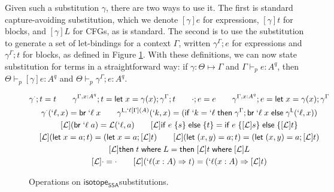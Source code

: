 \documentclass[acmsmall,screen,review]{acmart}
\newcommand{\mc}[1]{\ensuremath{\mathcal{#1}}}
\newcommand{\ms}[1]{\ensuremath{\mathsf{#1}}}
\newcommand{\lbl}[1]{{`#1}}
\newcommand{\lto}{\Rightarrow}
\newcommand{\letstmt}[3]{\ensuremath{\ms{let}\;#1 = #2; #3}}
\newcommand{\brb}[2]{\ms{br}\;#1\;#2}
\newcommand{\lbrb}[2]{\brb{\lbl{#1}}{#2}}
\newcommand{\ite}[3]{\ms{if}\;#1\;\{#2\}\;\ms{else}\;\{#3\}}
\newcommand{\ewhere}[2]{\ms{then}\;#1\;\ms{where}\;#2}
\newcommand{\wbranch}[3]{#1(#2) \lto #3}
\newcommand{\lwbranch}[3]{\wbranch{\lbl{#1}}{#2}{#3}}
\newcommand{\lhyp}[3]{#1[#2](#3)}
\newcommand{\llhyp}[3]{\lhyp{\lbl{#1}}{#2}{#3}}
\newcommand{\hasty}[5]{#1 \vdash_{#2} #3: {#4}^{#5}}
\newcommand{\issubst}[3]{#1: #2 \mapsto #3}
\newcommand{\exprletsubst}[2]{{#1};{#2}}
\newcommand{\stmtletsubst}[2]{{#1};{#2}}
\newcommand{\substctx}[2]{{#1}^{#2}}
\newcommand{\substlbs}[2]{{#1}^{#2}}
\newcommand{\restrictsubst}[2]{{#1}_{#2}}
\newcommand{\isotopessa}{\ms{isotope_{SSA}}}
\begin{document}
Given such a substitution \(\gamma\), there are two ways to use it. The first is
standard capture-avoiding substitution, which we denote \([\gamma]e\) for
expressions, \([\gamma]t\) for blocks, and \([\gamma]L\) for CFGs, as is
standard. The second is to use the substitution to generate a set of
let-bindings for a context \(\Gamma\), written
\(\exprletsubst{\substctx{\gamma}{\Gamma}}{e}\) for expressions and
\(\stmtletsubst{\substctx{\gamma}{\Gamma}}{t}\) for blocks, as defined in Figure
\ref{fig:ssa-subst-ops}. 
%
%
%
With these definitions, we can now state substitution for terms in a
straightforward way: if \(\issubst{\gamma}{\Theta}{\Gamma}\) and
\(\hasty{\Gamma}{p}{e}{A}{q}\), then \(\hasty{\Theta}{p}{[\gamma]e}{A}{q}\) and
\(\hasty{\Theta}{p}{\exprletsubst{\substctx{\gamma}{\Gamma}}{e}}{A}{q}\).

\begin{figure}
  \begin{gather*}
    \stmtletsubst{\substctx{\gamma}{\cdot}}{t} = t
    \qquad
    \stmtletsubst{\substctx{\gamma}{\Gamma, x: A^q}}{t} 
      = \letstmt{x}{\gamma(x)}{\stmtletsubst{\substctx{\gamma}{\Gamma}}{t}}
    \qquad
    \exprletsubst{\cdot}{e} = e
    \qquad
    \exprletsubst{\substctx{\gamma}{\Gamma, x: A^q}}{e} 
      = \letstmt{x}{\gamma(x)}{\substctx{\gamma}{\Gamma}}
    \\
    \substlbs{\gamma}{\cdot}(\lbl{\ell}, x) = \lbrb{\ell}{x}
    \qquad
    \substlbs{\gamma}{\ms{L}, \llhyp{\ell}{\Gamma}{A}}(\lbl{k}, x)
      = 
      (\ms{if}\; \lbl{k} = \lbl{\ell} 
      \;\ms{then}\;\stmtletsubst{\substctx{\gamma}{\Gamma}}{\lbrb{\ell}{x}}
      \;\ms{else}\;\substlbs{\gamma}{\ms{L}}(\lbl{\ell}, x))
    \\
    [\mc{L}](\lbrb{\ell}{a}) = \mc{L}(\lbl{\ell}, a)
    \qquad
    [\mc{L}]\ite{e}{s}{t} = \ite{e}{[\mc{L}]s}{[\mc{L}]t}
    \\
    [\mc{L}](\letstmt{x}{a}{t}) = (\letstmt{x}{a}{[\mc{L}]t})
    \qquad
    [\mc{L}](\letstmt{(x, y)}{a}{t}) = (\letstmt{(x, y)}{a}{[\mc{L}]t})
    \\
    [\mc{L}]\ewhere{t}{L} = \ewhere{[\mc{L}]t}{[\mc{L}]L}
    \\
    [\mc{L}]\cdot = \cdot
    \qquad
    [\mc{L}](\lwbranch{\ell}{x: A}{t})
    = (\lwbranch{\ell}{x: A}{[\mc{L}]t})
  \end{gather*}
  \caption{Operations on \isotopessa substitutions.}
  \label{fig:ssa-subst-ops}
\end{figure}
\end{document}
